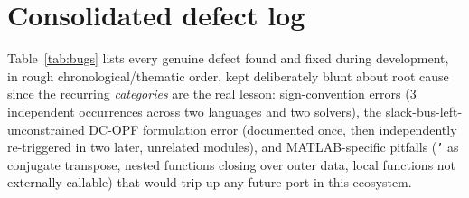 \documentclass[11pt]{report}
\theoremstyle{plain}
\theoremstyle{definition}
\theoremstyle{remark}
\begin{document}
\section{Consolidated defect log}

Table~\ref{tab:bugs} lists every genuine defect found and fixed during
development, in rough chronological/thematic order, kept deliberately
blunt about root cause since the recurring \emph{categories} are the
real lesson: sign-convention errors (3 independent occurrences across
two languages and two solvers), the slack-bus-left-unconstrained DC-OPF
formulation error (documented once, then independently re-triggered in
two later, unrelated modules), and MATLAB-specific pitfalls
(\texttt{'} as conjugate transpose, nested functions closing over outer
data, local functions not externally callable) that would trip up any
future port in this ecosystem.
\end{document}
